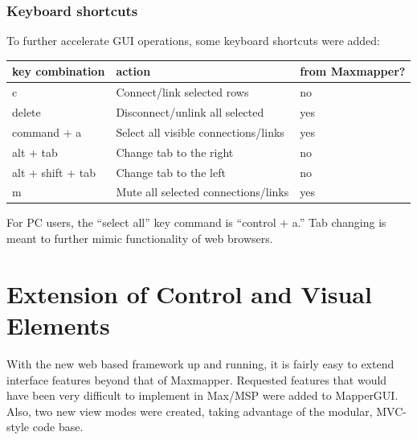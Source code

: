 
		\subsubsection{Keyboard shortcuts}

To further accelerate GUI operations, some keyboard shortcuts were added:

\begin{table}[!h]
	\centering
	\label{tab:list_view_shortcut_keys}
		\begin{tabular}{l  l  l}
		\hline\hline
		key combination&action&from Maxmapper?\\
		\hline
		c 					& Connect/link selected rows & no\\
		delete 				& Disconnect/unlink all selected & yes\\
		command + a 		& Select all visible connections/links & yes\\
		alt + tab 			& Change tab to the right & no\\
		alt + shift + tab 	& Change tab to the left & no\\ 
		m 					& Mute all selected connections/links & yes\\
		\end{tabular}
\end{table}

For PC users, the ``select all'' key command is ``control + a.'' Tab changing is meant to further mimic functionality of web browsers. 



\section{Extension of Control and Visual Elements} %
\label{sec:extension_of_control_and_visual_elements}

With the new web based framework up and running, it is fairly easy to extend interface features beyond that of Maxmapper. Requested features that would have been very difficult to implement in Max/MSP were added to MapperGUI. Also, two new view modes were created, taking advantage of the modular, MVC-style code base.

